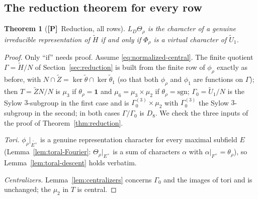 \documentclass[11pt]{article}
\newcommand{\tH}{\widetilde H}
\newcommand{\tZ}{\widetilde Z}
\newcommand{\tU}{\widetilde U}
\newcommand{\tth}{\widetilde\theta}
\newcommand{\Ptag}{\textnormal{\textbf{[P]}}}
\theoremstyle{plain}
\newtheorem{theorem}{Theorem}[section]
\theoremstyle{definition}
\begin{document}
\subsection{The reduction theorem for every row}
\begin{theorem}[\Ptag\ Reduction, all rows]\label{thm:reduction-all}
$L_D\Theta_\rho$ is the character of a genuine irreducible representation
of $\tH$ if and only if $\Phi_\rho$ is a virtual character of $\tU_1$.
\end{theorem}
\begin{proof}
Only ``if'' needs proof.  Assume \eqref{eq:normalized-central}.  The
finite quotient $\Gamma=\tH/N$ of Section~\ref{sec:reduction} is built
from the finite row of $\phi_\rho$ exactly as before, with
$N\cap\tZ=\ker\tth\cap\ker\tth_1$ (so that both $\phi_\rho$ and $\phi_1$
are functions on $\Gamma$); then $T=\tZ N/N$ is $\mu_3$ if
$\theta_\rho=\mathbf1$ and $\mu_6=\mu_3\times\mu_2$ if
$\theta_\rho=\mathrm{sgn}$; $\Gamma_0=\tU_1/N$ is the Sylow
$3$-subgroup in the first case and is $\Gamma_0^{(3)}\times\mu_2$ with
$\Gamma_0^{(3)}$ the Sylow $3$-subgroup in the second; in both cases
$\Gamma/\Gamma_0$ is $D_8$.  We check the three inputs of the proof
of Theorem~\ref{thm:reduction}.

\emph{Tori.}  $\phi_\rho|_{\widetilde{E^\times}}$ is a genuine
representation character for every maximal subfield $E$
(Lemma~\ref{lem:toral-Fourier}: $\Theta_\rho|_{E^\times}$ is a sum of
characters $\alpha$ with $\alpha|_{F^\times}=\theta_\rho$), so
Lemma~\ref{lem:toral-descent} holds verbatim.

\emph{Centralizers.}  Lemma~\ref{lem:centralizers} concerns $\Gamma_0$
and the images of tori and is unchanged; the $\mu_2$ in $T$ is central.


\end{proof}
\end{document}
